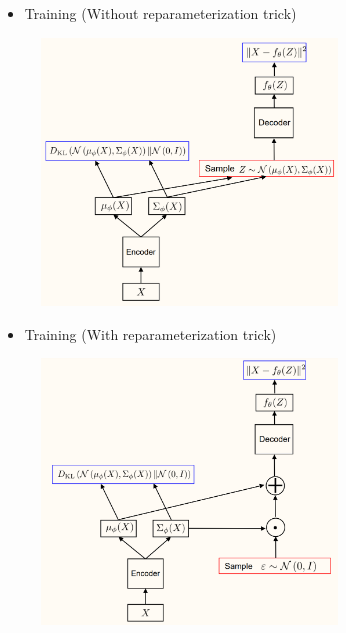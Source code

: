 \documentclass{report}
\begin{document}
\begin{concept}
    \begin{itemize}
        \item Training (Without reparameterization trick)
    \end{itemize}

    \begin{figure}[H]
        \centering
        \includegraphics[width=0.7\textwidth]{.././assets/11.5.png}
    \end{figure}

    \begin{itemize}
        \item Training (With reparameterization trick)
    \end{itemize}

    \begin{figure}[H]
        \centering
        \includegraphics[width=0.7\textwidth]{.././assets/11.6.png}
    \end{figure}


\end{concept}
\end{document}
